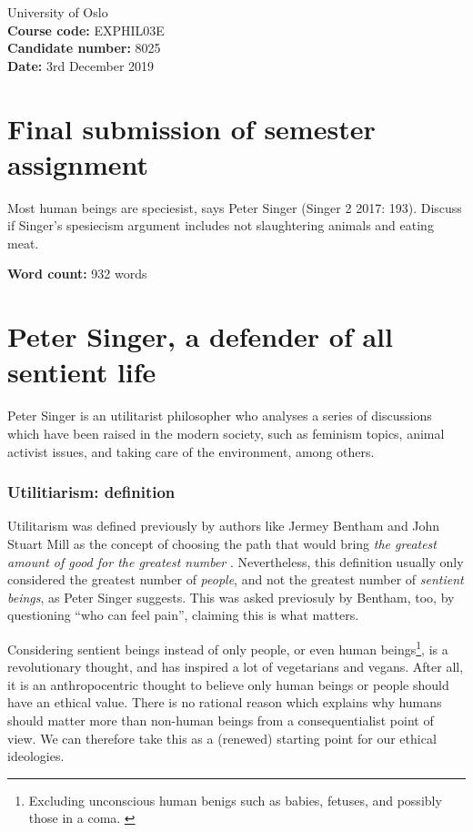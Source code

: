 \documentclass{article}
\newcommand{\q}[1]{``#1''}
\begin{document}
	\begin{flushright}
		University of Oslo
		\\\textbf{Course code:} EXPHIL03E
		\\\textbf{Candidate number:} 8025
		\\\textbf{Date:} 3rd December 2019
	\end{flushright}
\section*{Final submission of semester assignment}
Most human beings are speciesist, says Peter Singer (Singer 2 2017: 193). Discuss if Singer’s spesiecism argument includes not slaughtering animals and eating meat.%
		\begin{flushright}
			\textbf{Word count:} 932 words
		\end{flushright}
		\section*{Peter Singer, a defender of all sentient life}
		
		Peter Singer is an utilitarist philosopher who analyses a series of discussions which have been raised in the modern society, such as feminism topics, animal activist issues, and taking care of the environment, among others.

		\subsubsection*{Utilitiarism: definition}
		
		Utilitarism was defined previously by authors like Jermey Bentham and John Stuart Mill as the concept of choosing the path that would bring \emph{the greatest amount of good for the greatest number} \autocite{definitionutilitarism}. Nevertheless, this definition usually only considered the greatest number of \emph{people}, and not the greatest number of \emph{sentient beings}, as Peter Singer suggests. This was asked previosuly by Bentham, too, by questioning \q{who can feel pain}, claiming this is what matters.

		Considering sentient beings instead of only people, or even human beings\footnote{Excluding unconscious human benigs such as babies, fetuses, and possibly those in a coma. \autocite{singerpracticalethics}}, is a revolutionary thought, and has inspired a lot of vegetarians and vegans. After all, it is an anthropocentric thought to believe only human beings or people should have an ethical value. There is no rational reason which explains why humans should matter more than non-human beings from a consequentialist point of view. We can therefore take this as a (renewed) starting point for our ethical ideologies.
\end{document}
